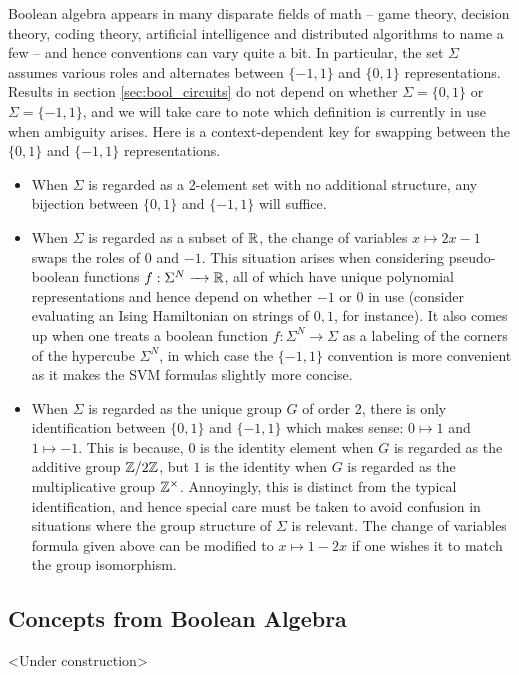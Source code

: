 \documentclass{article}
\begin{document}
\begin{rmk}\label{rmk:sigma_convention}
  Boolean algebra appears in many disparate fields of math -- game theory, decision theory, coding theory, artificial intelligence and distributed algorithms to name a few -- and hence conventions can vary quite a bit. In particular, the set $\Sigma$ assumes various roles and alternates between $\{-1, 1\}$ and $\{0,1\}$ representations. Results in section \ref{sec:bool_circuits} do not depend on whether $\Sigma = \{0,1\}$ or $\Sigma = \{-1,1\}$, and we will take care to note which definition is currently in use when ambiguity arises. Here is a context-dependent key for swapping between the $\{0,1\}$ and $\{-1,1\}$ representations.
  \begin{itemize}
    \item When $\Sigma$ is regarded as a 2-element set with no additional structure, any bijection between $\{0,1\}$ and $\{-1,1\}$ will suffice.
    \item When $\Sigma$ is regarded as a subset of $\mathbb{R}$, the change of variables $x \mapsto 2x - 1$ swaps the roles of $0$ and $-1$. This situation arises when considering pseudo-boolean functions $f:\Sigma^N \to \bR$, all of which have unique polynomial representations and hence depend on whether $-1$ or $0$ in use (consider evaluating an Ising Hamiltonian on strings of $0,1$, for instance). It also comes up when one treats a boolean function $f:\Sigma^N \to \Sigma$ as a labeling of the corners of the hypercube $\Sigma^N$, in which case the $\{-1,1\}$ convention is more convenient as it makes the SVM formulas slightly more concise.
    \item When $\Sigma$ is regarded as the unique group $G$ of order 2, there is only identification between $\{0,1\}$ and $\{-1,1\}$ which makes sense: $0 \mapsto 1$ and $1 \mapsto -1$. This is because, $0$ is the identity element when $G$ is regarded as the additive group $\mathbb{Z}/2\mathbb{Z}$, but $1$ is the identity when $G$ is regarded as the multiplicative group $\mathbb{Z}^\times$. Annoyingly, this is distinct from the typical identification, and hence special care must be taken to avoid confusion in situations where the group structure of $\Sigma$ is relevant. The change of variables formula given above can be modified to $x \mapsto 1 - 2x$ if one wishes it to match the group isomorphism.
  \end{itemize}
\end{rmk}

\subsection{Concepts from Boolean Algebra}
\begin{center}
  <Under construction>
\end{center}
\end{document}
